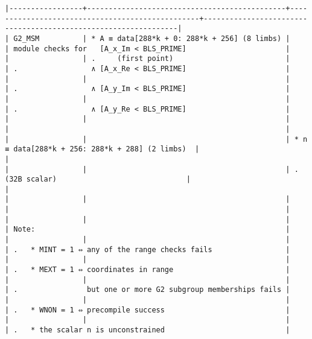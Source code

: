 \documentclass[varwidth=\maxdimen,margin=0.5cm,multi={verbatim}]{standalone}
\begin{document}
\begin{verbatim}
|-----------------+----------------------------------------------+-------------------------------------------------+----------------------------------------------------------------|
| G2_MSM          | * A ≡ data[288*k + 0: 288*k + 256] (8 limbs) |                                                 | module checks for   [A_x_Im < BLS_PRIME]                       |
|                 | .     (first point)                          |                                                 | .                 ∧ [A_x_Re < BLS_PRIME]                       |
|                 |                                              |                                                 | .                 ∧ [A_y_Im < BLS_PRIME]                       |
|                 |                                              |                                                 | .                 ∧ [A_y_Re < BLS_PRIME]                       |
|                 |                                              |                                                 |                                                                |
|                 |                                              | * n ≡ data[288*k + 256: 288*k + 288] (2 limbs)  |                                                                |
|                 |                                              | .     (32B scalar)                              |                                                                |
|                 |                                              |                                                 |                                                                |
|                 |                                              |                                                 | Note:                                                          |
|                 |                                              |                                                 | .   * MINT = 1 ⇔ any of the range checks fails                 |
|                 |                                              |                                                 | .   * MEXT = 1 ⇔ coordinates in range                          |
|                 |                                              |                                                 | .                but one or more G2 subgroup memberships fails |
|                 |                                              |                                                 | .   * WNON = 1 ⇔ precompile success                            |
|                 |                                              |                                                 | .   * the scalar n is unconstrained                            |

\end{verbatim}
\end{document}

